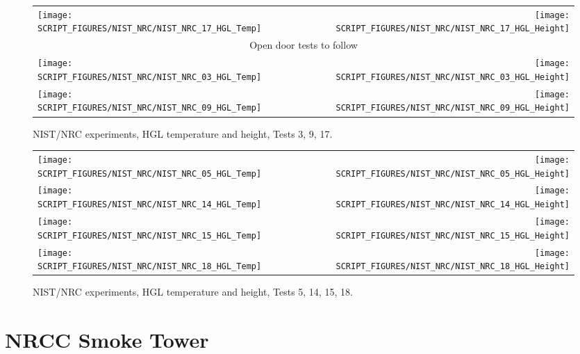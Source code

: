 \begin{figure}[p]
\begin{tabular*}{\textwidth}{l@{\extracolsep{\fill}}r}
\texttt{[image: SCRIPT\_FIGURES/NIST\_NRC/NIST\_NRC\_17\_HGL\_Temp]} &
\texttt{[image: SCRIPT\_FIGURES/NIST\_NRC/NIST\_NRC\_17\_HGL\_Height]} \\ [1.in]
\multicolumn{2}{c}{Open door tests to follow} \\ [1.in]
\texttt{[image: SCRIPT\_FIGURES/NIST\_NRC/NIST\_NRC\_03\_HGL\_Temp]} &
\texttt{[image: SCRIPT\_FIGURES/NIST\_NRC/NIST\_NRC\_03\_HGL\_Height]} \\
\texttt{[image: SCRIPT\_FIGURES/NIST\_NRC/NIST\_NRC\_09\_HGL\_Temp]} &
\texttt{[image: SCRIPT\_FIGURES/NIST\_NRC/NIST\_NRC\_09\_HGL\_Height]}
\end{tabular*}
\caption[NIST/NRC experiments, HGL temperature and height, Tests 3, 9, 17]
{NIST/NRC experiments, HGL temperature and height, Tests 3, 9, 17.}
\label{NIST_NRC_HGL_3}
\end{figure}

\begin{figure}[p]
\begin{tabular*}{\textwidth}{l@{\extracolsep{\fill}}r}
\texttt{[image: SCRIPT\_FIGURES/NIST\_NRC/NIST\_NRC\_05\_HGL\_Temp]} &
\texttt{[image: SCRIPT\_FIGURES/NIST\_NRC/NIST\_NRC\_05\_HGL\_Height]} \\
\texttt{[image: SCRIPT\_FIGURES/NIST\_NRC/NIST\_NRC\_14\_HGL\_Temp]} &
\texttt{[image: SCRIPT\_FIGURES/NIST\_NRC/NIST\_NRC\_14\_HGL\_Height]} \\
\texttt{[image: SCRIPT\_FIGURES/NIST\_NRC/NIST\_NRC\_15\_HGL\_Temp]} &
\texttt{[image: SCRIPT\_FIGURES/NIST\_NRC/NIST\_NRC\_15\_HGL\_Height]} \\
\texttt{[image: SCRIPT\_FIGURES/NIST\_NRC/NIST\_NRC\_18\_HGL\_Temp]} &
\texttt{[image: SCRIPT\_FIGURES/NIST\_NRC/NIST\_NRC\_18\_HGL\_Height]}
\end{tabular*}
\caption[NIST/NRC experiments, HGL temperature and height, Tests 5, 14, 15, 18]
{NIST/NRC experiments, HGL temperature and height, Tests 5, 14, 15, 18.}
\label{NIST_NRC_HGL_4}
\end{figure}


\clearpage

\section{NRCC Smoke Tower}

